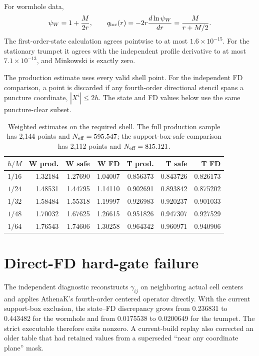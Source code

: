 \documentclass[11pt]{article}
\begin{document}
For wormhole data,
\begin{equation}
 \psi_W=1+\frac{M}{2r},\qquad
 q_{\rm loc}(r)=-2r\frac{d\ln\psi_W}{dr}
 =\frac{M}{r+M/2}.
\end{equation}
The first-order-state calculation agrees pointwise to at most
$1.6\times10^{-15}$.  For the stationary trumpet it agrees with the
independent profile derivative to at most $7.1\times10^{-13}$, and Minkowski
is exactly zero.

\begin{table}[ht]
\centering
\small
The production estimate uses every valid shell point. For the independent FD
comparison, a point is discarded if any fourth-order directional stencil spans
a puncture coordinate, $|X^i|\le2h$. The state and FD values below use the same
puncture-clear subset.

\begin{tabular}{crrrrrr}
\toprule
$h/M$ & W prod. & W safe & W FD & T prod. & T safe & T FD\\
\midrule
$1/16$ & 1.32184 & 1.27690 & 1.04007 & 0.856373 & 0.843726 & 0.826173\\
$1/24$ & 1.48531 & 1.44795 & 1.14110 & 0.902691 & 0.893842 & 0.875202\\
$1/32$ & 1.58484 & 1.55318 & 1.19997 & 0.926983 & 0.920237 & 0.901033\\
$1/48$ & 1.70032 & 1.67625 & 1.26615 & 0.951826 & 0.947307 & 0.927529\\
$1/64$ & 1.76543 & 1.74606 & 1.30258 & 0.964342 & 0.960971 & 0.940906\\
\bottomrule
\end{tabular}
\caption{Weighted estimates on the required shell. The full production sample
has 2,144 points and $N_{\rm eff}=595.547$; the support-box-safe comparison has
2,112 points and $N_{\rm eff}=815.121$.}
\end{table}

\section{Direct-FD hard-gate failure}

The independent diagnostic reconstructs $\gamma_{ij}$ on neighboring actual
cell centers and applies AthenaK's fourth-order centered operator directly.
With the current support-box exclusion, the state--FD discrepancy grows from
0.236831 to 0.443482 for the wormhole and from 0.0175538 to 0.0200649 for the
trumpet. The strict executable therefore exits nonzero. A current-build replay
also corrected an older table that had retained values from a superseded
``near any coordinate plane'' mask.
\end{document}
